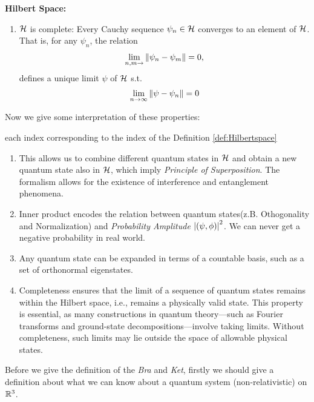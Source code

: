 \begin{definition}{\textbf{Hilbert Space:}}
\begin{enumerate}
        \begin{eqnarray}
            \norm{\psi-\psi_n} \leq 0
        \end{eqnarray}
        \item $\mathcal{H}$ is complete: Every Cauchy sequence $\psi_n \in \mathcal{H}$ converges to an element of $\mathcal{H}$. That is, for any $\psi_n$, the relation 
        \begin{eqnarray}
            \lim_{n,m \rightarrow} \left\lVert \psi_n - \psi_m \right\rVert = 0,  
        \end{eqnarray}
        defines a unique limit $\psi$ of $\mathcal{H}$ s.t.
        \begin{eqnarray}
            \lim_{n\rightarrow \infty} \left\lVert \psi-\psi_n \right\rVert = 0
        \end{eqnarray}
     \end{enumerate}
\end{definition}
Now we give some interpretation of these properties: 
\begin{inter}
    each index corresponding to the index of the Definition \ref{def:Hilbertspace}
\begin{enumerate} 
    \item This allows us to combine different quantum states in $\mathcal{H}$ and obtain a new quantum state also in $\mathcal{H}$, which imply \textit{Principle of Superposition}. The formalism allows for the existence of interference and entanglement phenomena.
    \item Inner product encodes the relation between quantum states(z.B. Othogonality and Normalization) and \textit{Probability Amplitude} $\left| \left(\psi,\phi\right) \right|^2$. We can never get a negative probability in real world.
    \item Any quantum state can be expanded in terms of a countable basis, such as a set of orthonormal eigenstates.
    \item Completeness ensures that the limit of a sequence of quantum states remains within the Hilbert space, i.e., remains a physically valid state.
    This property is essential, as many constructions in quantum theory—such as Fourier transforms and ground-state decompositions—involve taking limits. Without completeness, such limits may lie outside the space of allowable physical states.
\end{enumerate}
\end{inter}
Before we give the definition of the \textit{Bra} and \textit{Ket}, firstly we should give a definition about what we can know about a quantum system (non-relativistic) on $\mathbb{R}^3$. 
